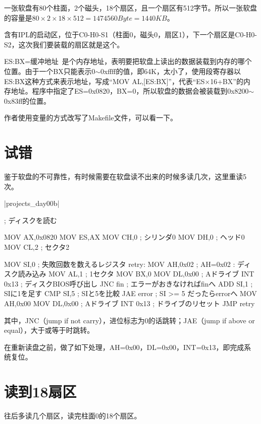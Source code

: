 一张软盘有80个柱面，2个磁头，18个扇区，且一个扇区有512字节。所以一张软盘的容量是$80\times 2\times 18\times 512=1474560 Byte= 1440KB$。

含有IPL的启动区，位于C0-H0-S1（柱面0，磁头0，扇区1），下一个扇区是C0-H0-S2，这次我们要装载的扇区就是这个。

ES:BX=缓冲地址~是个内存地址，表明要把软盘上读出的数据装载到内存的哪个位置。由于一个BX只能表示0$\sim$0xffff的值，即64K，太小了，使用段寄存器以ES:BX这种方式来表示地址，写成“MOV AL,[ES:BX]”，代表“ES$\times$16+BX”的内存地址。程序中指定了ES=0x0820，BX=0，所以软盘的数据会被装载到0x8200$\sim$0x83ff的位置。
\cs

作者使用变量的方式改写了Makefile文件，可以看一下。

\section{	试错	}
鉴于软盘的不可靠性，有时候需要在软盘读不出来的时候多读几次，这里重读5次。

\dag|projects_day\harib00b|
\begin{code}[label=ipl.nas 本次添加的部分]
; ディスクを読む

		MOV		AX,0x0820
		MOV		ES,AX
		MOV		CH,0			; シリンダ0
		MOV		DH,0			; ヘッド0
		MOV		CL,2			; セクタ2

		MOV		SI,0			; 失敗回数を数えるレジスタ
retry:
		MOV		AH,0x02			; AH=0x02 : ディスク読み込み
		MOV		AL,1			; 1セクタ
		MOV		BX,0
		MOV		DL,0x00			; Aドライブ
		INT		0x13			; ディスクBIOS呼び出し
		JNC		fin				; エラーがおきなければfinへ
		ADD		SI,1			; SIに1を足す
		CMP		SI,5			; SIと5を比較
		JAE		error			; SI >= 5 だったらerrorへ
		MOV		AH,0x00
		MOV		DL,0x00			; Aドライブ
		INT		0x13			; ドライブのリセット
		JMP		retry
\end{code}

其中，JNC（jump if not carry），进位标志为0的话跳转；JAE（jump if above or equal），大于或等于时跳转。

在重新读盘之前，做了如下处理，AH=0x00，DL=0x00，INT=0x13，即完成系统复位。
\section{	读到18扇区	}
往后多读几个扇区，读完柱面0的18个扇区。


